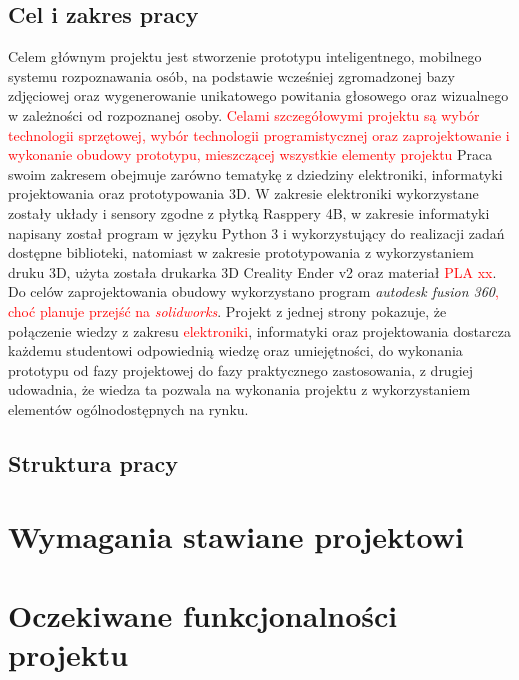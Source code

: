 \documentclass[a4paper,12pt,reqno]{article}
\begin{document}
\subsection{Cel i zakres pracy}
Celem głównym projektu jest stworzenie prototypu inteligentnego, mobilnego systemu rozpoznawania osób, na podstawie wcześniej zgromadzonej bazy zdjęciowej oraz wygenerowanie unikatowego powitania głosowego oraz wizualnego w zależności od rozpoznanej osoby.
\newline
\textcolor{red}{Celami szczegółowymi projektu są wybór technologii sprzętowej, wybór technologii programistycznej oraz zaprojektowanie i wykonanie obudowy prototypu, mieszczącej wszystkie elementy projektu}
\newline
Praca swoim zakresem obejmuje zarówno tematykę z dziedziny elektroniki, informatyki projektowania oraz prototypowania 3D.
\newline
W zakresie elektroniki wykorzystane zostały układy i sensory zgodne z płytką Rasppery 4B, w zakresie informatyki napisany został program w języku Python 3 i wykorzystujący do realizacji zadań dostępne biblioteki, natomiast w zakresie prototypowania z wykorzystaniem druku 3D, użyta została drukarka 3D Creality Ender v2 oraz materiał \textcolor{red}{PLA xx}. Do celów zaprojektowania obudowy wykorzystano program \textit{autodesk fusion 360}\textcolor{red}{, choć planuje przejść na \textit{solidworks}}.
\newline
Projekt z jednej strony pokazuje, że połączenie wiedzy z zakresu \textcolor{red}{elektroniki}, informatyki oraz projektowania dostarcza każdemu studentowi odpowiednią wiedzę oraz umiejętności, do wykonania prototypu od fazy projektowej do fazy praktycznego zastosowania,  z drugiej udowadnia, że wiedza ta pozwala na wykonania projektu z wykorzystaniem elementów ogólnodostępnych na rynku.
\subsection{Struktura pracy}

\newpage
\section{Wymagania stawiane projektowi}

\newpage
\section{Oczekiwane funkcjonalności projektu}
\end{document}

